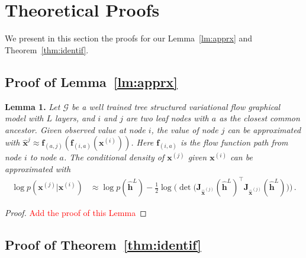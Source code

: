 \documentclass[twoside]{article}
\begin{document}
\section{Theoretical Proofs}
We present in this section the proofs for our Lemma~\ref{lm:apprx} and Theorem~\ref{thm:identif}.
\subsection{Proof of Lemma~\ref{lm:apprx}}\label{appd:proof_lm1}
\textbf{Lemma 1.} {\it Let $\mathcal{G}$ be a well trained tree structured variational flow graphical model with $L$ layers, and $i$ and $j$ are two leaf nodes with $a$ as the closest common ancestor. 
Given observed value at node $i$, the value of node $j$ can be approximated with $\widehat{\mathbf{x}}^{j} \approx  \mathbf{f}_{(a,j)}(\mathbf{f}_{(i, a)}(\mathbf{x}^{(i)}))$. Here $\mathbf{f}_{(i, a)}$ is the flow function path from node $i$ to node $a$. 
The conditional density of $\mathbf{x}^{(j)}$ given $\mathbf{x}^{(i)}$ can be approximated with 
\begin{align*} %
\log p(\mathbf{x}^{(j)} | \mathbf{x}^{(i)}) &\approx  \log p(\widehat{\mathbf{h}}^L) -  \frac{1}{2} \log \big(\det \big(\mathbf{J}_{\widehat{\mathbf{x}}^{(j)}}(\widehat{\mathbf{h}}^L)^\top\mathbf{J}_{\widehat{\mathbf{x}}^{(j)}}(\widehat{\mathbf{h}}^L)\big) \big) \, .
\end{align*}
}

\begin{proof}
\textcolor{red}{Add the proof of this Lemma}
\end{proof}


\subsection{Proof of Theorem~\ref{thm:identif}}\label{appd:proof_thm1}
\end{document}
